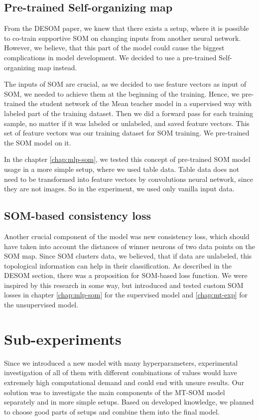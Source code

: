 \subsection{Pre-trained Self-organizing map}

From the DESOM paper, we knew that there exists a setup, where it is possible to co-train supportive SOM on changing inputs from another neural network. However, we believe, that this part of the model could cause the biggest complications in model development. We decided to use a pre-trained Self-organizing map instead. 

The inputs of SOM are crucial, as we decided to use feature vectors as input of SOM, we needed to achieve them at the beginning of the training. Hence, we pre-trained the student network of the Mean teacher model in a supervised way with labeled part of the training dataset. Then we did a forward pass for each training sample, no matter if it was labeled or unlabeled, and saved feature vectors. This set of feature vectors was our training dataset for SOM training. We pre-trained the SOM model on it. 

In the chapter \ref{chap:mlp-som}, we tested this concept of pre-trained SOM model usage in a more simple setup, where we used table data. Table data does not need to be transformed into feature vectors by convolutions neural network, since they are not images. So in the experiment, we used only vanilla input data.


\subsection{SOM-based consistency loss}
Another crucial component of the model was new consistency loss, which should have taken into account the distances of winner neurons of two data points on the SOM map. Since SOM clusters data, we believed, that if data are unlabeled, this topological information can help in their classification. As described in the DESOM section, there was a proposition for SOM-based loss function. We were inspired by this research in some way, but introduced and tested custom SOM losses in chapter \ref{chap:mlp-som} for the supervised model and \ref{chap:mt-exp} for the unsupervised model.


\section{Sub-experiments}
Since we introduced a new model with many hyperparameters, experimental investigation of all of them with different combinations of values would have extremely high computational demand and could end with unsure results. Our solution was to investigate the main components of the MT-SOM model separately and in more simple setups. Based on developed knowledge, we planned to choose good parts of setups and combine them into the final model.

